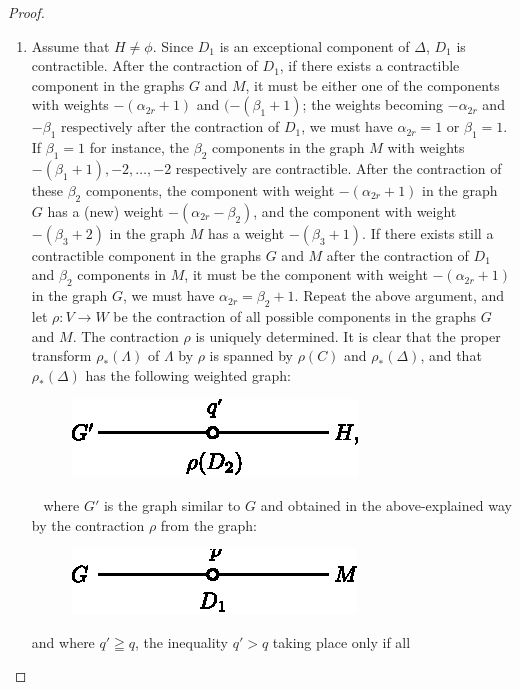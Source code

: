 \begin{proof}
\begin{enumerate}
\item Assume that $H\neq \phi$. Since $D_{1}$ is an exceptional
  component of $\Delta$, $D_{1}$ is contractible. After the
  contraction of $D_{1}$, if there exists a contractible component in
  the graphs $G$ and $M$, it must be either one of the components with
  weights $-(\alpha_{2r}+1)$ and $(-(\beta_{1}+1)$; the weights
  becoming $-\alpha_{2r}$ and $-\beta_{1}$ respectively after the
  contraction of $D_{1}$, we must have $\alpha_{2r}=1$ or
  $\beta_{1}=1$. If $\beta_{1}=1$ for instance, the $\beta_{2}$
  components in the graph $M$ with weights $-(\beta_{1}+1),
  -2,\ldots,-2$ respectively are contractible. After the contraction
  of these $\beta_{2}$ components, the component with weight
  $-(\alpha_{2r}+1)$ in the graph $G$ has a (new) weight
  $-(\alpha_{2r}-\beta_{2})$, and the component with weight
  $-(\beta_{3}+2)$ in the graph $M$ has a weight $-(\beta_{3}+1)$. If
  there exists still a contractible component in the graphs $G$ and
  $M$ after the contraction of $D_{1}$ and $\beta_{2}$ components in
  $M$, it must be the component with weight $-(\alpha_{2r}+1)$ in the
  graph $G$, \iec we must have $\alpha_{2r}=\beta_{2}+1$. Repeat the
  above argument, and let $\rho:V\to W$ be the contraction of all
  possible components in the graphs $G$ and $M$. The contraction
  $\rho$ is uniquely determined. It is clear that the proper transform
  $\rho_{\ast}(\Lambda)$ of $\Lambda$ by $\rho$ is spanned by
  $\rho(C)$ and $\rho_{\ast}(\Delta)$, and that $\rho_{\ast}(\Delta)$
  has the following weighted graph:
\begin{figure}[H]
\centering
\includegraphics[scale=1.1]{figures/chap2-fig19.eps}
\end{figure}\pageoriginale\
\noindent
where $G'$ is the graph similar to $G$ and obtained in the
above-explained way by the contraction $\rho$ from the graph:
\begin{figure}[H]
\centering
\includegraphics[scale=1.1]{figures/chap2-fig20.eps}
\end{figure}
\noindent
and where $q'\geqq q$, the inequality $q'>q$ taking place only if all

\end{enumerate}
\end{proof}
